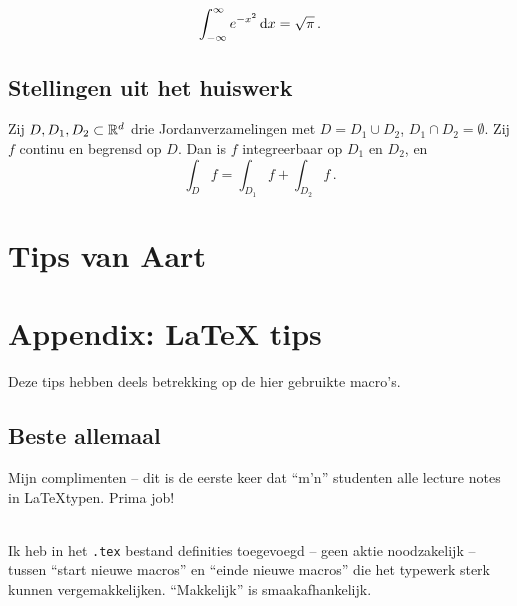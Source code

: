 \documentclass{2wa40summary}
\begin{document}
		\begin{theorem}
			\[ 
				\int_{-\infty}^{\infty} e^{-x^2} \mathop{}\!\mathrm{d} x = \sqrt{\pi} \,.
			 \]
		\end{theorem}
		
		\subsection{Stellingen uit het huiswerk}
		\begin{theorem}
			Zij $D,D_1,D_2 \subset \mathbb{R}^d$ drie Jordanverzamelingen met $D=D_1 \cup D_2$, $D_1 \cap D_2 = \emptyset$. Zij $f$ continu en begrensd op $D$. Dan is $f$ integreerbaar op $D_1$ en $D_2$, en \[ 
				\int_D f = \int_{D_1} f + \int_{D_2} f \,.
			 \]
		\end{theorem}
		
	    
		\newpage
		\section{Tips van Aart}			
		
		
		
		
		\newpage
		
		\appendix
		\section{Appendix: LaTeX tips}
		
		\opm Deze tips hebben deels betrekking op de hier gebruikte macro's.
		
		\subsection{Beste allemaal}
		
		Mijn complimenten -- dit is de eerste keer dat ``m'n'' studenten alle lecture notes in \LaTeX typen.
		Prima job!
		
		\ \\
		Ik heb in het \verb$.tex$ bestand definities toegevoegd -- geen aktie noodzakelijk -- tussen
		``start nieuwe macros'' en ``einde nieuwe macros'' die het
		typewerk sterk kunnen vergemakkelijken. ``Makkelijk'' is smaakafhankelijk.
		
\end{document}

